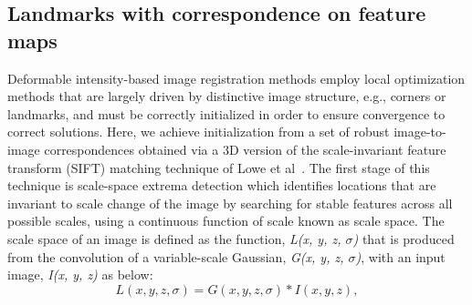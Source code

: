 \documentclass{llncs}
\begin{document}
\subsection{Landmarks with correspondence on feature maps}
\label{subsec:Correspondence}
Deformable intensity-based image registration methods employ local optimization methods that are largely driven by distinctive image structure, e.g., corners or landmarks, and must be correctly initialized in order to ensure convergence to correct solutions. Here, we achieve initialization from a set of robust image-to-image correspondences obtained via a 3D version of the scale-invariant feature transform (SIFT) matching technique of Lowe et al~\cite{Lowe:04}. The first stage of this technique is scale-space extrema detection which identifies locations that are invariant to scale change of the image by searching for stable features across all possible scales, using a continuous function of scale known as scale space. The scale space of an image is defined as the function, \textit{L(x, y, z, $\sigma$)} that is produced from the convolution of a variable-scale Gaussian, \textit{G(x, y, z, $\sigma$)}, with an input image, \textit{I(x, y, z)} as below:
\begin{equation}
    L(x, y, z, \sigma) = G(x, y, z, \sigma) * I(x, y, z),
\end{equation}
\end{document}
